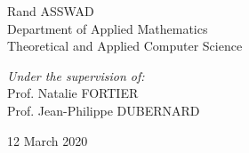\documentclass[
  american,
]{article}
\begin{document}
\begin{titlepage}
\begin{sffamily}
\begin{center}
            \begin{minipage}{0.45\textwidth}
            \begin{flushleft} \large
                Rand ASSWAD\\
                Department of Applied Mathematics\\
                Theoretical and Applied Computer Science
            \end{flushleft}
            \end{minipage}
            \begin{minipage}{0.45\textwidth}
            \begin{flushright} \large
                \emph{Under the supervision of:}\\
                Prof. Natalie FORTIER\\
                Prof. Jean-Philippe DUBERNARD
            \end{flushright}
            \end{minipage}

            \vfill
            {\large 12 March 2020}
        \end{center}
    \end{sffamily}
\end{titlepage}
\makeatother

{
\setcounter{tocdepth}{3}
\tableofcontents
}
\def\R{\mathbb{R}}
\def\C{\mathbb{C}}
\def\N{\mathbb{N}}
\def\Z{\mathbb{Z}}

\def\x{\tilde{x}}
\def\w{\omega}
\def\phi{\varphi}

\def\dt{\mathrm{d}t}

\def\pp#1{\left(#1\right)}
\def\sset#1{\left\{#1\right\}}
\def\vset#1#2{\sset{#1\left\lvert#2\right.}}

\def\abs #1{\left\lvert#1\right\rvert}
\def\norm#1{\left\lVert#1\right\rVert}
\def\dotp#1#2{\left\langle#1{;}#2\right\rangle}

\def\pmat#1{\begin{pmatrix}#1\end{pmatrix}}

\def\qtext#1{\quad\text{#1}\quad}

\def\argmin{\mathop{\mathrm{argmin}}}
\def\argmax{\mathop{\mathrm{argmax}}}
\def\supp{\mathop{\mathrm{supp}}}

\def\transp#1{{#1}^{\top}}

\def\f{\boldsymbol{f}}
\def\ff{\f\hspace{-2pt}\f}
\def\mf{\boldsymbol{mf}}
\def\mp{\boldsymbol{mp}}
\def\p{\boldsymbol{p}}
\def\piu{pi\grave{u}~}
\end{document}
